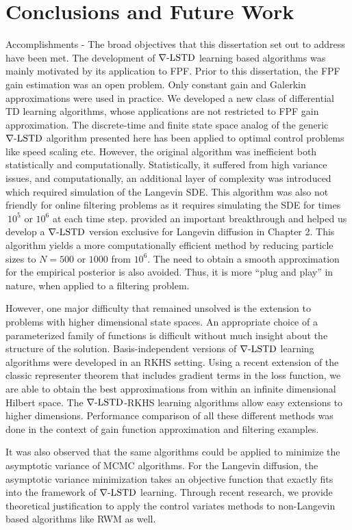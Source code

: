 \chapter{Conclusions and Future Work}
\label{ch:conclusions}
Accomplishments - 
The broad objectives that this dissertation set out to address have been met. The development of $\nabla\text{-LSTD}$ learning based algorithms was mainly motivated by its application to FPF. Prior to this dissertation, the FPF gain estimation was an open problem. Only constant gain and Galerkin approximations were used in practice. We developed a new class of differential TD learning algorithms, whose applications are not restricted to FPF gain approximation. The discrete-time and finite state space analog of the generic $\nabla\text{-LSTD}$ algorithm presented here has been applied to optimal control problems like speed scaling etc. However, the original algorithm was inefficient both statistically and computationally. Statistically, it suffered from high variance issues, and computationally, an additional layer of complexity was introduced which required simulation of the Langevin SDE. This algorithm was also not friendly for online filtering problems as it requires simulating the SDE for times $~10^5$ or $10^6$ at each time step.  provided an important breakthrough and helped us develop a $\nabla\text{-LSTD}$ version exclusive for Langevin diffusion in Chapter 2. This algorithm yields a more computationally efficient method by reducing particle sizes to $N=500$ or $1000$ from $10^6$. The need to obtain a smooth approximation for the empirical posterior is also avoided. Thus, it is more ``plug and play'' in nature, when applied to a filtering problem.  

However, one major difficulty that remained unsolved is the extension to problems with higher dimensional state spaces. An appropriate choice of a parameterized family of functions is difficult without much insight about the structure of the solution. Basis-independent versions of $\nabla\text{-LSTD}$ learning algorithms were developed in an RKHS setting. Using a recent extension of the classic representer theorem that includes gradient terms in the loss function, we are able to obtain the best approximations from within an infinite dimensional Hilbert space. The $\nabla\text{-LSTD}$-RKHS learning algorithms allow easy extensions to higher dimensions. Performance comparison of all these different methods was done in the context of gain function approximation and filtering examples. 

It was also observed that the same algorithms could be applied to minimize the asymptotic variance of MCMC algorithms. For the Langevin diffusion, the asymptotic variance minimization takes an objective function that exactly fits into the framework of $\nabla\text{-LSTD}$ learning. Through recent research, we provide theoretical justification to apply the control variates methods to non-Langevin based algorithms like RWM as well. 

